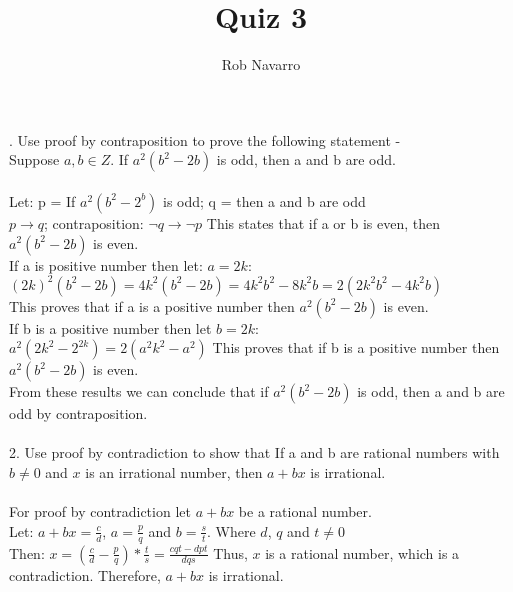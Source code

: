 \documentclass[11pt, oneside]{article}   	%
\title{Quiz 3}
\author{Rob Navarro}
\begin{document}
\maketitle
. Use proof by contraposition to prove the following statement - \\
Suppose $a,b\in Z$. If $a^2(b^2 - 2b)$ is odd, then a and b are odd.\\\\
Let: p = If $a^2(b^2 - 2^b)$ is odd; q = then a and b are odd\\
$p\to q$; contraposition: $\neg q\to\neg p$
This states that if a or b is even, then $a^2(b^2 - 2b)$ is even. \\
If a is positive number then let: $a = 2k$:\\
$(2k)^2(b^2 - 2b) = 4k^2(b^2 - 2b) = 4k^2b^2 - 8k^2b = 2(2k^2b^2 - 4k^2b)$\\
This proves that if a is a positive number then $a^2(b^2 - 2b)$ is even.\\
If b is a positive number then let $b = 2k$:\\
$a^2(2k^2 - 2^{2k}) = 2(a^2k^2 - a^2)$
This proves that if b is a positive number then $a^2(b^2 - 2b)$ is even.\\
From these results we can conclude that if $a^2(b^2 - 2b)$ is odd, then a and b are odd by contraposition.\\\\
2. Use proof by contradiction to show that If a and b are rational numbers with $b\neq 0$ and $x$ is an irrational number, then $a + bx$ is irrational.\\\\
For proof by contradiction let $a + bx$ be a rational number.\\
Let: $a + bx =\frac{c}{d}$, $a =\frac{p}{q}$ and $b =\frac{s}{t}$. Where $d$, $q$ and $t\neq 0$\\
Then: $x = (\frac{c}{d} -\frac{p}{q}) *\frac{t}{s} = \frac{cqt - dpt}{dqs}$
Thus, $x$ is a rational number, which is a contradiction. Therefore, $a + bx$ is irrational.\\
\end{document}
